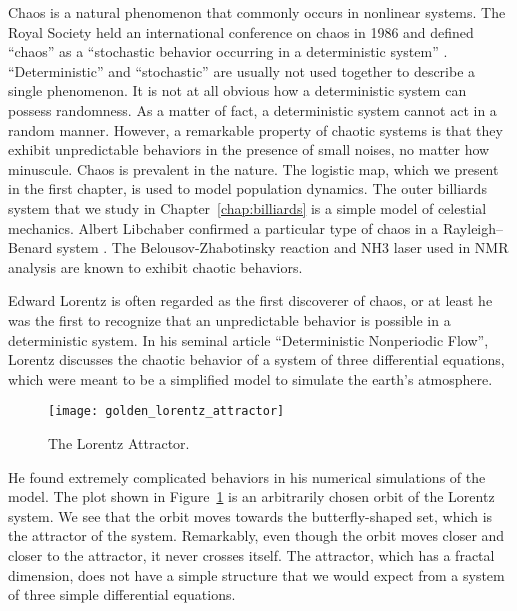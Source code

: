 \documentclass[10pt,twoside]{book}
\begin{document}
Chaos is a natural phenomenon that commonly occurs in nonlinear systems.
The Royal Society held an international conference on chaos in 1986 and defined ``chaos'' as a ``stochastic behavior occurring in a deterministic system'' \citep{stewart}.
``Deterministic'' and ``stochastic'' are usually not used together to describe a single phenomenon.
It is not at all obvious how a deterministic system can possess randomness.
As a matter of fact, a deterministic system cannot act in a random manner.
However, a remarkable property of chaotic systems is that they exhibit unpredictable behaviors in the presence of small noises, no matter how minuscule.
Chaos is prevalent in the nature.
The logistic map, which we present in the first chapter, is used to model population dynamics.
The outer billiards system that we study in Chapter~\ref{chap:billiards} is a simple model of celestial mechanics.
Albert Libchaber confirmed a particular type of chaos in a Rayleigh–Benard system \citep{libchaber}.
The Belousov-Zhabotinsky reaction \citep{zhang} and NH3 laser used in NMR analysis \citep{kantz-schreiber} are known to exhibit chaotic behaviors.

Edward Lorentz is often regarded as the first discoverer of chaos, or at least he was the first to recognize that an unpredictable behavior is possible in a deterministic system.
In his seminal article ``Deterministic Nonperiodic Flow'', Lorentz discusses the chaotic behavior of a system of three differential equations, which were meant to be a simplified model to simulate the earth's atmosphere.
\begin{figure}[ht]
  \centering
  \texttt{[image: golden\_lorentz\_attractor]}
  \caption{The Lorentz Attractor.}
  \label{fig:lorentz}
\end{figure}
He found extremely complicated behaviors in his numerical simulations of the model.
The plot shown in Figure~\ref{fig:lorentz} is an arbitrarily chosen orbit of the Lorentz system.
We see that the orbit moves towards the butterfly-shaped set, which is the attractor of the system.
Remarkably, even though the orbit moves closer and closer to the attractor, it never crosses itself.
The attractor, which has a fractal dimension, does not have a simple structure that we would expect from a system of three simple differential equations.
\end{document}
